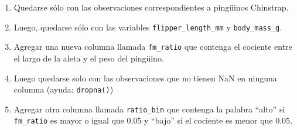 \documentclass[a4paper,11pt]{article}
\theoremstyle{definition}
\begin{document}
\begin{enumerate}
\begin{enumerate}
\item Quedarse sólo con las observaciones correspondientes a ping\"uinos Chinstrap.
\item Luego, quedarse sólo con las variables \lstinline{flipper_length_mm} y \lstinline{body_mass_g}.
\item Agregar una nueva columna llamada \lstinline{fm_ratio} que contenga el cociente entre el largo de la aleta y el peso del ping\"uino.
\item Luego quedarse solo con las observaciones que no tienen NaN en ninguna columna (ayuda: \lstinline{dropna()})
\item Agregar otra columna llamada \lstinline{ratio_bin} que contenga la palabra ``alto'' si \lstinline{fm_ratio} es mayor o igual que $0.05$ y ``bajo'' si el cociente es menor que $0.05$.
\end{enumerate}

\end{enumerate}
\end{document}
